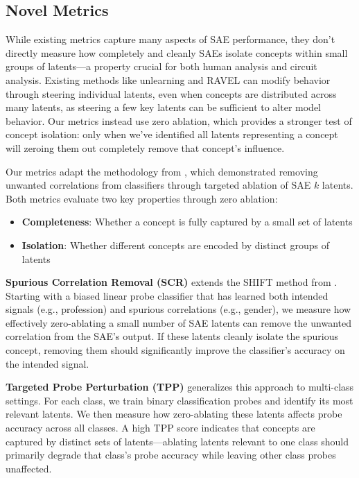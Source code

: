 \documentclass{article}
\theoremstyle{plain}
\theoremstyle{definition}
\theoremstyle{remark}
\begin{document}
\subsection{Novel Metrics}

While existing metrics capture many aspects of SAE performance, they don't directly measure how completely and cleanly SAEs isolate concepts within small groups of latents—a property crucial for both human analysis and circuit analysis. Existing methods like unlearning and RAVEL can modify behavior through steering individual latents, even when concepts are distributed across many latents, as steering a few key latents can be sufficient to alter model behavior. Our metrics instead use zero ablation, which provides a stronger test of concept isolation: only when we've identified all latents representing a concept will zeroing them out completely remove that concept's influence.

Our metrics adapt the methodology from \citet{marks2024sparsefeaturecircuitsdiscovering}, which demonstrated removing unwanted correlations from classifiers through targeted ablation of SAE $k$ latents. Both metrics evaluate two key properties through zero ablation:

\begin{itemize}[itemsep=2pt,topsep=0pt]
    \item \textbf{Completeness}: Whether a concept is fully captured by a small set of latents
    \item \textbf{Isolation}: Whether different concepts are encoded by distinct groups of latents
\end{itemize}

\textbf{Spurious Correlation Removal (SCR)} extends the SHIFT method from \citet{marks2024sparsefeaturecircuitsdiscovering}. Starting with a biased linear probe classifier that has learned both intended signals (e.g., profession) and spurious correlations (e.g., gender), we measure how effectively zero-ablating a small number of SAE latents can remove the unwanted correlation from the SAE's output. If these latents cleanly isolate the spurious concept, removing them should significantly improve the classifier's accuracy on the intended signal.

\textbf{Targeted Probe Perturbation (TPP)} generalizes this approach to multi-class settings. For each class, we train binary classification probes and identify its most relevant latents. We then measure how zero-ablating these latents affects probe accuracy across all classes. A high TPP score indicates that concepts are captured by distinct sets of latents—ablating latents relevant to one class should primarily degrade that class's probe accuracy while leaving other class probes unaffected.
\end{document}
